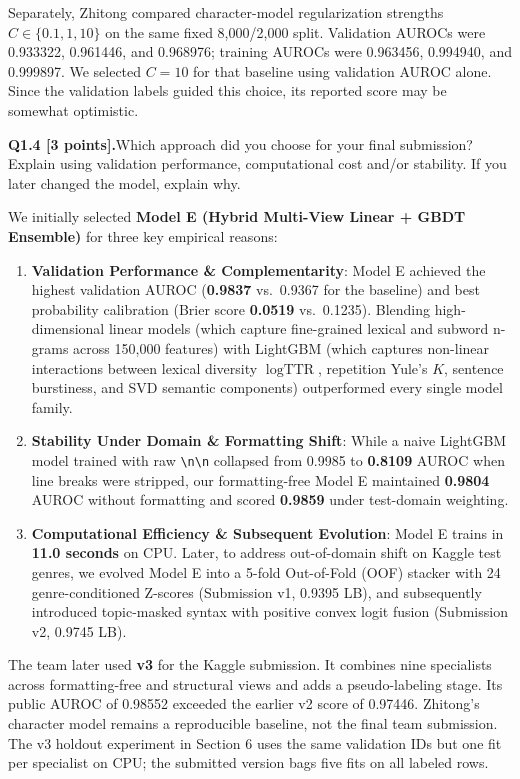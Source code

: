 \documentclass[11pt,letterpaper]{article}
\newcommand{\question}[2]{\needspace{4\baselineskip}\par\addvspace{0.45em}\noindent\textbf{#1}\quad #2\par\nobreak\vspace{0.1em}}
\begin{document}
Separately, Zhitong compared character-model regularization strengths $C\in\{0.1,1,10\}$ on the same fixed 8,000/2,000 split. Validation AUROCs were 0.933322, 0.961446, and 0.968976; training AUROCs were 0.963456, 0.994940, and 0.999897. We selected $C=10$ for that baseline using validation AUROC alone. Since the validation labels guided this choice, its reported score may be somewhat optimistic.
\question{Q1.4 [3 points].}{Which approach did you choose for your final submission? Explain using validation performance, computational cost and/or stability. If you later changed the model, explain why.}
We initially selected \textbf{Model E (Hybrid Multi-View Linear + GBDT Ensemble)} for three key empirical reasons:
\begin{enumerate}[leftmargin=*,itemsep=1pt,topsep=2pt]
    \item \textbf{Validation Performance \& Complementarity}: Model E achieved the highest validation AUROC (\textbf{0.9837} vs.\ 0.9367 for the baseline) and best probability calibration (Brier score \textbf{0.0519} vs.\ 0.1235). Blending high-dimensional linear models (which capture fine-grained lexical and subword n-grams across 150,000 features) with LightGBM (which captures non-linear interactions between lexical diversity $\log\text{TTR}$, repetition Yule's $K$, sentence burstiness, and SVD semantic components) outperformed every single model family.
    \item \textbf{Stability Under Domain \& Formatting Shift}: While a naive LightGBM model trained with raw \texttt{\textbackslash n\textbackslash n} collapsed from 0.9985 to \textbf{0.8109} AUROC when line breaks were stripped, our formatting-free Model E maintained \textbf{0.9804} AUROC without formatting and scored \textbf{0.9859} under test-domain weighting.
    \item \textbf{Computational Efficiency \& Subsequent Evolution}: Model E trains in \textbf{11.0 seconds} on CPU. Later, to address out-of-domain shift on Kaggle test genres, we evolved Model E into a 5-fold Out-of-Fold (OOF) stacker with 24 genre-conditioned Z-scores (Submission v1, 0.9395 LB), and subsequently introduced topic-masked syntax with positive convex logit fusion (Submission v2, 0.9745 LB).
\end{enumerate}

The team later used \textbf{v3} for the Kaggle submission. It combines nine specialists across formatting-free and structural views and adds a pseudo-labeling stage. Its public AUROC of 0.98552 exceeded the earlier v2 score of 0.97446. Zhitong's character model remains a reproducible baseline, not the final team submission. The v3 holdout experiment in Section 6 uses the same validation IDs but one fit per specialist on CPU; the submitted version bags five fits on all labeled rows.
\end{document}

